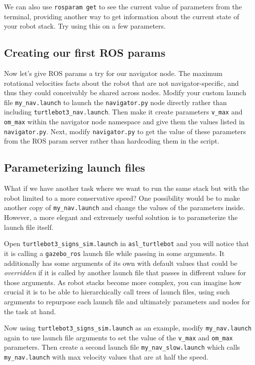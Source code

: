 \documentclass{article}
\begin{document}
We can also use \texttt{rosparam get} to see the current value of parameters from the terminal, providing another way to get information about the current state of your robot stack. Try using this on a few parameters.

\subsection{Creating our first ROS params}

Now let's give ROS params a try for our navigator node. The maximum rotational velocities facts about the robot that are not navigator-specific, and thus they could conceivably be shared across nodes. Modify your custom launch file \texttt{my\_nav.launch} to launch the \texttt{navigator.py} node directly rather than including \texttt{turtlebot3\_nav.launch}. Then make it create parameters \texttt{v\_max} and \texttt{om\_max} within the navigator node namespace and give them the values listed in \texttt{navigator.py}. Next, modify \texttt{navigator.py} to get the value of these parameters from the ROS param server rather than hardcoding them in the script.

\subsection{Parameterizing launch files}
What if we have another task where we want to run the same stack but with the robot limited to a more conservative speed? One possibility would be to make another copy of \texttt{my\_nav.launch} and change the values of the parameters inside. However, a more elegant and extremely useful solution is to parameterize the launch file itself.

Open \texttt{turtlebot3\_signs\_sim.launch} in \texttt{asl\_turtlebot} and you will notice that it is calling a \texttt{gazebo\_ros} launch file while passing in some arguments. It additionally has some arguments of its own with default values that could be \textit{overridden} if it is called by another launch file that passes in different values for those arguments. As robot stacks become more complex, you can imagine how crucial it is to be able to hierarchically call trees of launch files, using such arguments to repurpose each launch file and ultimately parameters and nodes for the task at hand.

Now using \texttt{turtlebot3\_signs\_sim.launch} as an example, modify \texttt{my\_nav.launch} again to use launch file arguments to set the value of the \texttt{v\_max} and \texttt{om\_max} parameters. Then create a second launch file \texttt{my\_nav\_slow.launch} which calls \texttt{my\_nav.launch} with max velocity values that are at half the speed.
\end{document}
